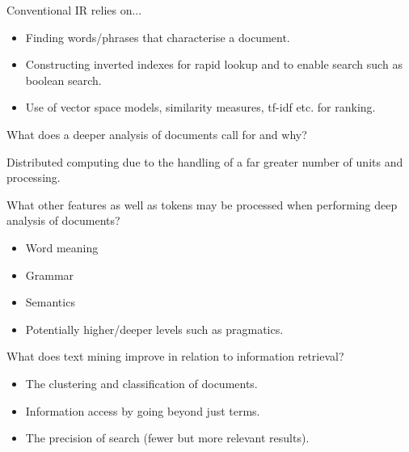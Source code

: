 \documentclass[2by4,grid]{flashcards}
\begin{document}
\begin{flashcard}{Conventional IR relies on...}
	\begin{center}
        \begin{itemize}
            \item Finding words/phrases that characterise a document.
            \item Constructing inverted indexes for rapid lookup and to enable search such as boolean search.
            \item Use of vector space models, similarity measures, tf-idf etc. for ranking.
        \end{itemize}
	\end{center}
\end{flashcard}

\begin{flashcard}{What does a deeper analysis of documents call for and why?}
	\begin{center}
        Distributed computing due to the handling of a far greater number of units and processing.
	\end{center}
\end{flashcard}

\begin{flashcard}{What other features as well as tokens may be processed when performing deep analysis of documents?}
	\begin{center}
        \begin{itemize}
            \item Word meaning
            \item Grammar
            \item Semantics
            \item Potentially higher/deeper levels such as pragmatics.
        \end{itemize}
	\end{center}
\end{flashcard}

\begin{flashcard}{What does text mining improve in relation to information retrieval?}
	\begin{center}
        \begin{itemize}
            \item The clustering and classification of documents.
            \item Information access by going beyond just terms.
            \item The precision of search (fewer but more relevant results).
    \end{itemize}
	\end{center}
\end{flashcard}
\end{document}
